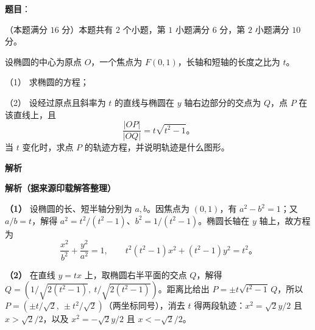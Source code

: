 \begin{answer}

\textbf{题目}：

（本题满分 $16$ 分）本题共有 $2$ 个小题，第 $1$ 小题满分 $6$ 分，第 $2$ 小题满分 $10$ 分。

设椭圆的中心为原点 $O$，一个焦点为 $F(0,1)$，长轴和短轴的长度之比为 $t$。

（1） 求椭圆的方程；

（2） 设经过原点且斜率为 $t$ 的直线与椭圆在 $y$ 轴右边部分的交点为 $Q$，点 $P$ 在该直线上，且
\nopagebreak[4]
\[
\frac{|OP|}{|OQ|}=t\sqrt{t^2-1}\mbox{。}
\]
当 $t$ 变化时，求点 $P$ 的轨迹方程，并说明轨迹是什么图形。

\textbf{解析}

\textbf{解析（据来源印载解答整理）}

\textbf{（1）} 设椭圆的长、短半轴分别为 $a,b$。因焦点为 $(0,1)$，有 $a^2-b^2=1$；又 $a/b=t$，解得 $a^2=t^2/(t^2-1)$、$b^2=1/(t^2-1)$。椭圆长轴在 $y$ 轴上，故方程为
\nopagebreak[4]
\[
\frac{x^2}{b^2}+\frac{y^2}{a^2}=1,
\qquad t^2(t^2-1)x^2+(t^2-1)y^2=t^2\mbox{。}
\]

\textbf{（2）} 在直线 $y=tx$ 上，取椭圆右半平面的交点 $Q$，解得 $Q=(1/\sqrt{2(t^2-1)},\allowbreak\ t/\sqrt{2(t^2-1)})$。距离比给出 $P=\pm t\sqrt{t^2-1}\,Q$，所以 $P=(\pm t/\sqrt2,\ \pm t^2/\sqrt2)$（两坐标同号），消去 $t$ 得两段轨迹：$x^2=\sqrt2y/2$ 且 $x>\sqrt2/2$，以及 $x^2=-\sqrt2y/2$ 且 $x<-\sqrt2/2$。



\end{answer}

